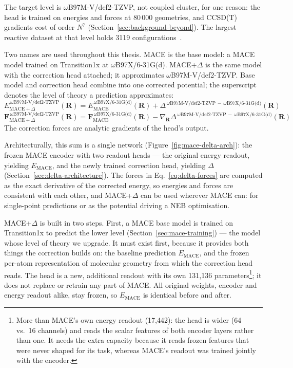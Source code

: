 The target level is \mbox{$\omega$B97M-V/def2-TZVP}, not coupled
cluster, for one reason: the head is trained on energies and forces at
80\,000 geometries, and CCSD(T) gradients cost of order $N^7$
(Section~\ref{sec:background-beyond}). The largest reactive dataset at
that level holds 3119 configurations~\cite{allen2026}.

Two names are used throughout this thesis. MACE is the base model: a
MACE model trained on Transition1x at \mbox{$\omega$B97X/6-31G(d)}.
MACE+$\Delta$ is the same model with the correction head attached; it
approximates \mbox{$\omega$B97M-V/def2-TZVP}. Base model and
correction head combine into one corrected potential; the superscript
denotes the level of theory a prediction approximates:
%
\begin{equation}
E_{\text{MACE}+\Delta}^{\,\omega\text{B97M-V/def2-TZVP}}(\mathbf{R})
=
E_{\text{MACE}}^{\,\omega\text{B97X/6-31G(d)}}(\mathbf{R})
+ \Delta^{\,\omega\text{B97M-V/def2-TZVP}\,-\,\omega\text{B97X/6-31G(d)}}(\mathbf{R})
\label{eq:delta-energy}
\end{equation}
%
\begin{equation}
\mathbf{F}_{\text{MACE}+\Delta}^{\,\omega\text{B97M-V/def2-TZVP}}(\mathbf{R})
=
\mathbf{F}_{\text{MACE}}^{\,\omega\text{B97X/6-31G(d)}}(\mathbf{R})
- \nabla_{\mathbf{R}}\Delta^{\,\omega\text{B97M-V/def2-TZVP}\,-\,\omega\text{B97X/6-31G(d)}}(\mathbf{R})
\label{eq:delta-forces}
\end{equation}
%
The correction forces are analytic gradients of the head's output.

Architecturally, this sum is a single network
(Figure~\ref{fig:mace-delta-arch}): the frozen MACE encoder with two
readout heads --- the original energy readout, yielding
$E_{\text{MACE}}$, and the newly trained correction head, yielding
$\Delta$ (Section~\ref{sec:delta-architecture}). The forces in
Eq.~\eqref{eq:delta-forces} are computed as the exact derivative of the
corrected energy, so energies and forces are consistent with each
other, and MACE+$\Delta$ can be used wherever MACE can: for
single-point predictions or as the potential driving a NEB
optimisation.

MACE+$\Delta$ is built in two steps. First, a MACE base model is trained on
Transition1x to predict the lower level (Section~\ref{sec:mace-training}) --- the model whose level of theory we upgrade. It
must exist first, because it provides both things the correction builds on:
the baseline prediction $E_{\text{MACE}}$, and the frozen per-atom
representation of molecular geometry from which the correction head reads.
The head is a new, additional readout with its own 131{,}136
parameters\footnote{More than MACE's own energy readout (17{,}442): the head
is wider (64 vs.\ 16 channels) and reads the scalar features of both encoder
layers rather than one. It needs the extra capacity because it reads frozen
features that were never shaped for its task, whereas MACE's readout was
trained jointly with the encoder.}; it does not replace or retrain any part
of MACE. All original weights, encoder and energy readout alike, stay frozen,
so $E_{\text{MACE}}$ is identical before and after.

